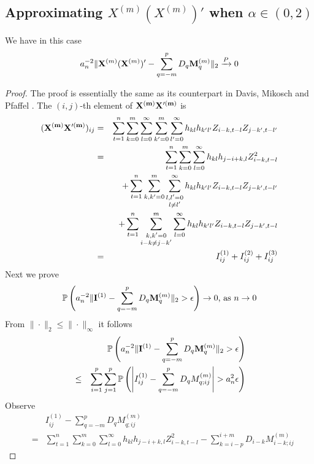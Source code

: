 \documentclass{article}
\begin{document}
\subsection[Approximation by DM when alpha in (0,2)]{Approximating
  $X^{(m)}(X^{(m)})'$ when $\alpha \in (0, 2)$}
We have in this case
\[
a_n^{-2} \|\mathbf{X}^{(m)} (\mathbf{X}^{(m)})' - \sum_{q=-m}^p D_q \mathbf{M}_q^{(m)}\|_2
\xrightarrow{P} 0
\]
\begin{proof}
  The proof is essentially the same as its counterpart in Davis,
  Mikosch and Pfaffel \cite{Mikosch2014}. The $(i,j)$-th element of
  $\mathbf{X^{(m)} X'^{(m)}}$ is
  \begin{eqnarray*}
    (\mathbf{X^{(m)} X'^{(m)}})_{ij} &=&
    \sum_{t=1}^n \sum_{k=0}^m \sum_{l=0}^\infty \sum_{k'=0}^m
    \sum_{l'=0}^\infty h_{kl} h_{k'l'} Z_{i-k, t-l} Z_{j-k', t-l'} \\
    &=& \sum_{t=1}^n \sum_{k=0}^m \sum_{l=0}^\infty h_{kl}h_{j-i+k,l}
    Z_{i-k, t-l}^2 \\
    && + \sum_{t=1}^n \sum_{k, k'=0}^m \sum_{\substack{l,l'=0\\l\neq l'}}^\infty
    h_{kl} h_{k'l'} Z_{i-k, t-l} Z_{j-k', t-l'} \\
    && + \sum_{t=1}^n \sum_{\substack{k,k'=0\\ i-k \neq j-k'}}^m \sum_{l=0}^{\infty}
    h_{kl} h_{k'l'} Z_{i-k, t-l} Z_{j-k', t-l} \\
    &=& I^{(1)}_{ij} + I^{(2)}_{ij} + I^{(3)}_{ij}
  \end{eqnarray*}
  Next we prove
  \begin{eqnarray*}
    \mathbb{P}\left(
      a_n^{-2} \|\mathbf{I}^{(1)} - \sum_{q=-m}^p D_q \mathbf{M}_{q}^{(m)}\|_2 > \epsilon
    \right) \to 0 \text{, as } n \to 0
  \end{eqnarray*}
  From $\|\cdot\|_2 \leq \|\cdot\|_\infty$ it follows
  \begin{eqnarray*}
    && \mathbb{P}\left(
      a_n^{-2} \|\mathbf{I}^{(1)} - \sum_{q=-m}^p D_q \mathbf{M}_{q}^{(m)}\|_2 > \epsilon
    \right) \\
    &\leq& \sum_{i=1}^p \sum_{j=1}^p \mathbb{P}\left(
      \left| I^{(1)}_{ij} - \sum_{q=-m}^p D_q M_{q; ij}^{(m)} \right| > a_n^2
      \epsilon \right)
  \end{eqnarray*}
  Observe
  \begin{eqnarray*}
    && I^{(1)}_{ij} - \sum_{q=-m}^p D_q M_{q; ij}^{(m)} \\
    &=& \sum_{t=1}^n \sum_{k=0}^m \sum_{l=0}^\infty h_{kl}h_{j-i+k,l}
    Z_{i-k, t-l}^2 - \sum_{k=i-p}^{i+m} D_{i-k} M_{i-k; ij}^{(m)}

\end{eqnarray*}
\end{proof}
\end{document}
